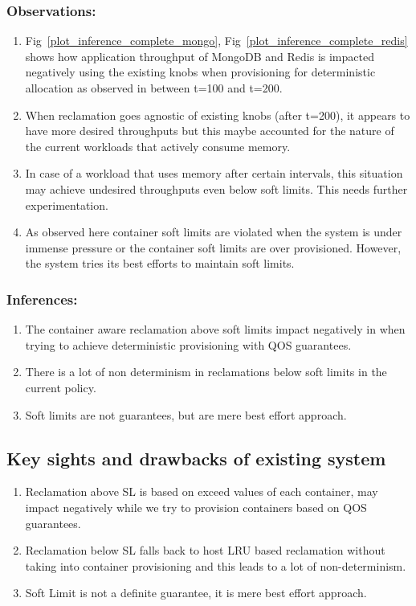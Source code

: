 	\subsubsection{Observations:}
	  \begin{enumerate}
	    \item Fig~\ref{plot_inference_complete_mongo}, Fig~\ref{plot_inference_complete_redis} shows how application throughput of 
MongoDB and Redis is impacted negatively using the existing knobs when provisioning for deterministic allocation as observed in between 
t=100 and t=200.
	    \item When reclamation goes agnostic of existing knobs (after t=200), it appears to have more desired throughputs but this 
maybe accounted for the nature of the current workloads that actively consume memory. 
	    \item  In case of a workload that uses memory after certain intervals, this situation may achieve undesired throughputs even 
below soft limits. This needs further experimentation.
	    \item As observed here container soft limits are violated when the system is under immense pressure or the container soft 
limits are over provisioned. However, the system tries its best efforts to maintain soft limits.  
	  \end{enumerate}
	  
	\subsubsection{Inferences:}
	  \begin{enumerate}
	    \item The container aware reclamation above soft limits impact negatively in when trying to achieve deterministic provisioning 
with QOS guarantees.
	    \item There is a lot of non determinism in reclamations below soft limits in the current policy.
	    \item Soft limits are not guarantees, but are mere best effort approach.
	  \end{enumerate}

  \subsection{Key sights and drawbacks of existing system}
    \begin{enumerate}
      \item Reclamation above SL is based on exceed values of each container, may impact negatively while we try to provision containers 
based on QOS guarantees.
      \item Reclamation below SL falls back to host LRU based reclamation without taking into container provisioning and this leads to a 
lot of non-determinism.
      \item Soft Limit is not a definite guarantee, it is mere best effort approach.
    \end{enumerate}
    
